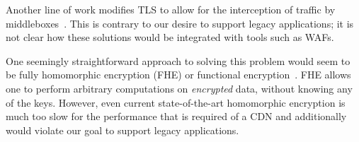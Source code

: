 Another line of work modifies TLS to allow for the interception of traffic by
middleboxes~\cite{naylor2015multi,naylor2017and,leematls}.
%
This is contrary to our desire to support legacy applications; it is not clear
how these solutions would be integrated with tools such as WAFs.
%

%



One seemingly straightforward approach to solving this problem would seem to be
fully homomorphic encryption (FHE) or functional
encryption~\cite{gentry2009fully, gentry2010computing, garg2016candidate}.
%
FHE allows one to perform arbitrary computations on \textit{encrypted} data,
without knowing any of the keys.  
%
However, even current state-of-the-art homomorphic encryption is much too slow
for the performance that is required of a CDN and additionally would violate
our goal to support legacy applications.


